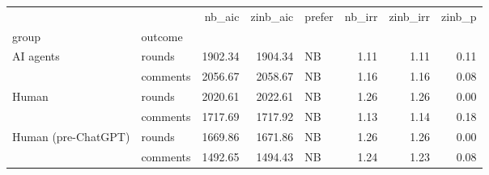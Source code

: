 \begin{tabular}{llrrlrrr}
\toprule
 &  & nb_aic & zinb_aic & prefer & nb_irr & zinb_irr & zinb_p \\
group & outcome &  &  &  &  &  &  \\
\midrule
\multirow[t]{2}{*}{AI agents} & rounds & 1902.34 & 1904.34 & NB & 1.11 & 1.11 & 0.11 \\
 & comments & 2056.67 & 2058.67 & NB & 1.16 & 1.16 & 0.08 \\
\cline{1-8}
\multirow[t]{2}{*}{Human} & rounds & 2020.61 & 2022.61 & NB & 1.26 & 1.26 & 0.00 \\
 & comments & 1717.69 & 1717.92 & NB & 1.13 & 1.14 & 0.18 \\
\cline{1-8}
\multirow[t]{2}{*}{Human (pre-ChatGPT)} & rounds & 1669.86 & 1671.86 & NB & 1.26 & 1.26 & 0.00 \\
 & comments & 1492.65 & 1494.43 & NB & 1.24 & 1.23 & 0.08 \\
\cline{1-8}
\bottomrule
\end{tabular}
